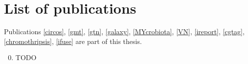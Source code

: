 \chapter{List of publications}
\label{AppendixD}

Publications \ref{circos}, \ref{gmt}, \ref{gtn}, \ref{galaxy}, \ref{MYcrobiota}, \ref{VN}, \ref{ireport}, \ref{cgtag}, \ref{chromothripsis}, \ref{ifuse} are part of this thesis.

\begin{enumerate}
\setcounter{enumi}{-1}

\item TODO


\end{enumerate}
